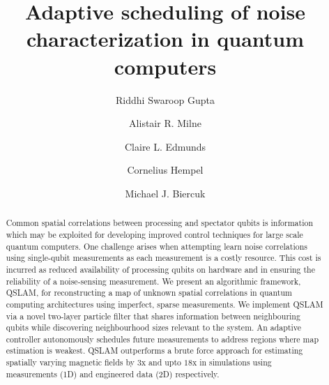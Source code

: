 \documentclass[reprint,longbibliography]{revtex4-1} %
\begin{document}
\title{Adaptive scheduling of noise characterization in quantum computers}

\author{Riddhi Swaroop Gupta} 

\author{Alistair R. Milne} 

\author{Claire L. Edmunds} 

\author{Cornelius Hempel} 

\author{Michael J. Biercuk}

\begin{abstract}
Common spatial correlations between processing and spectator qubits is information which may be exploited for developing improved control techniques for large scale quantum computers. One challenge arises when attempting learn noise correlations using single-qubit measurements as each measurement is a costly resource. This cost is incurred as reduced availability of processing qubits on hardware and in ensuring the reliability of a noise-sensing measurement. We present an algorithmic framework, QSLAM, for reconstructing a map of unknown spatial correlations in quantum computing architectures using imperfect, sparse measurements. We implement QSLAM via a novel two-layer particle filter that shares information between neighbouring qubits while discovering neighbourhood sizes relevant to the system. An adaptive controller autonomously schedules future measurements to address regions where map estimation is weakest. QSLAM outperforms a brute force approach for estimating spatially varying magnetic fields by $3$x and upto $18$x in simulations using measurements (1D) and engineered data (2D) respectively.
\end{abstract}



\maketitle
\end{document}
